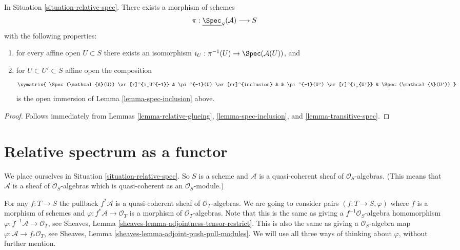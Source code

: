 \begin{lemma}
\label{lemma-glue-relative-spec}
In Situation \ref{situation-relative-spec}.
There exists a morphism of schemes
$$
\pi : \underline{\Spec}_S(\mathcal{A}) \longrightarrow S
$$
with the following properties:
\begin{enumerate}
\item for every affine open $U \subset S$ there exists an isomorphism
$i_U : \pi^{-1}(U) \to \Spec(\mathcal{A}(U))$, and
\item for $U \subset U' \subset S$ affine open the composition
$$
\xymatrix{
\Spec(\mathcal{A}(U)) \ar[r]^{i_U^{-1}} &
\pi^{-1}(U) \ar[rr]^{inclusion} & &
\pi^{-1}(U') \ar[r]^{i_{U'}} &
\Spec(\mathcal{A}(U'))
}
$$
is the open immersion of Lemma \ref{lemma-spec-inclusion} above.
\end{enumerate}
\end{lemma}

\begin{proof}
Follows immediately from
Lemmas \ref{lemma-relative-glueing},
\ref{lemma-spec-inclusion}, and
\ref{lemma-transitive-spec}.
\end{proof}












\section{Relative spectrum as a functor}
\label{section-spec}

\noindent
We place ourselves in Situation \ref{situation-relative-spec}.
So $S$ is a scheme and $\mathcal{A}$ is a quasi-coherent sheaf of
$\mathcal{O}_S$-algebras. (This means that $\mathcal{A}$ is a
sheaf of $\mathcal{O}_S$-algebras which is quasi-coherent as an
$\mathcal{O}_S$-module.)

\medskip\noindent
For any $f : T \to S$ the pullback
$f^*\mathcal{A}$ is a quasi-coherent sheaf of $\mathcal{O}_T$-algebras.
We are going to consider pairs $(f : T \to S, \varphi)$ where
$f$ is a morphism of schemes and $\varphi : f^*\mathcal{A} \to \mathcal{O}_T$
is a morphism of $\mathcal{O}_T$-algebras. Note that this is the
same as giving a $f^{-1}\mathcal{O}_S$-algebra homomorphism
$\varphi : f^{-1}\mathcal{A} \to \mathcal{O}_T$, see
Sheaves, Lemma \ref{sheaves-lemma-adjointness-tensor-restrict}.
This is also the same as giving a $\mathcal{O}_S$-algebra map
$\varphi : \mathcal{A} \to f_*\mathcal{O}_T$, see
Sheaves, Lemma \ref{sheaves-lemma-adjoint-push-pull-modules}.
We will use all three ways of thinking about $\varphi$,
without further mention.

